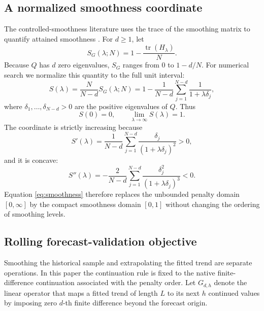 \documentclass[english]{smcca}
\newcommand{\tr}{\operatorname{tr}}
\begin{document}
\subsection{A normalized smoothness coordinate}

The controlled-smoothness literature uses the trace of the smoothing matrix to quantify attained smoothness \cite{guerrero2008smoothness,cortes2017smoothness}. For \(d\ge1\), let
\[
S_G(\lambda;N)
=
1-\frac{\tr(H_\lambda)}{N}.
\]
Because \(Q\) has \(d\) zero eigenvalues, \(S_G\) ranges from \(0\) to \(1-d/N\). For numerical search we normalize this quantity to the full unit interval:
\begin{equation}
S(\lambda)
=
\frac{N}{N-d}S_G(\lambda;N)
=
1-
\frac{1}{N-d}
\sum_{j=1}^{N-d}
\frac{1}{1+\lambda\delta_j},
\label{eq:smoothness}
\end{equation}
where \(\delta_1,\ldots,\delta_{N-d}>0\) are the positive eigenvalues of \(Q\). Thus
\[
S(0)=0,
\qquad
\lim_{\lambda\to\infty}S(\lambda)=1.
\]
The coordinate is strictly increasing because
\begin{equation}
S'(\lambda)
=
\frac{1}{N-d}
\sum_{j=1}^{N-d}
\frac{\delta_j}{(1+\lambda\delta_j)^2}
>0,
\label{eq:sprime}
\end{equation}
and it is concave:
\begin{equation}
S''(\lambda)
=
-\frac{2}{N-d}
\sum_{j=1}^{N-d}
\frac{\delta_j^2}{(1+\lambda\delta_j)^3}
<0.
\label{eq:ssecond}
\end{equation}
Equation \eqref{eq:smoothness} therefore replaces the unbounded penalty domain \([0,\infty]\) by the compact smoothness domain \([0,1]\) without changing the ordering of smoothing levels.

\subsection{Rolling forecast-validation objective}

Smoothing the historical sample and extrapolating the fitted trend are separate operations. In this paper the continuation rule is fixed to the native finite-difference continuation associated with the penalty order. Let \(G_{d,h}\) denote the linear operator that maps a fitted trend of length \(L\) to its next \(h\) continued values by imposing zero \(d\)-th finite difference beyond the forecast origin.
\end{document}
